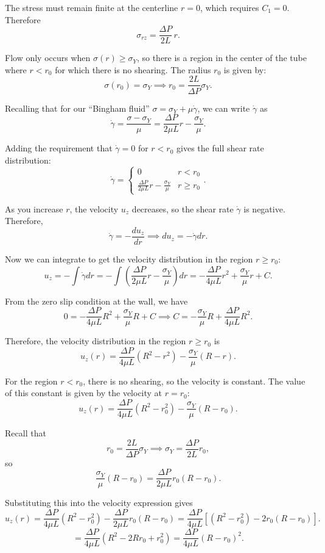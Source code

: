 The stress must remain finite at the centerline $r=0$, which requires $C_1 = 0$. Therefore
\[
	\boxed{\sigma_{rz} = \frac{\Delta P}{2L}\, r}.
\]

Flow only occurs when $\sigma(r) \geq \sigma_Y$, so there is a region in the center of the tube where $r < r_0$ for which there is no shearing.
The radius $r_0$ is given by:
\[
	\sigma(r_0) = \sigma_Y \implies r_0 = \frac{2L}{\Delta P}\sigma_Y.
\]

Recalling that for our ``Bingham fluid'' $\sigma = \sigma_Y + \mu \dot\gamma$, we can write $\dot\gamma$ as
\[
	\dot\gamma = \frac{\sigma - \sigma_Y}{\mu}
	= \frac{\Delta P}{2\mu L}r - \frac{\sigma_Y}{\mu}.
\]

Adding the requirement that $\dot\gamma = 0$ for $r < r_0$ gives the full shear rate distribution:
\[
	\boxed{\dot\gamma = \begin{cases}
		0 & r < r_0 \\
		\frac{\Delta P}{2\mu L}r - \frac{\sigma_Y}{\mu} & r \geq r_0
	\end{cases}}.
\]

As you increase $r$, the velocity $u_z$ decreases, so the shear rate $\dot\gamma$ is negative. Therefore,
\[
	\dot\gamma  = - \frac{du_z}{dr} \implies du_z = -\dot\gamma dr.
\]

Now we can integrate to get the velocity distribution in the region $r \geq r_0$:
\[
	u_z = -\int \dot\gamma dr
		= -\int \left(\frac{\Delta P}{2\mu L}r - \frac{\sigma_Y}{\mu}\right) dr
		= -\frac{\Delta P}{4\mu L}r^2 + \frac{\sigma_Y}{\mu}r + C.
\]

From the zero slip condition at the wall, we have
\[
	0 = -\frac{\Delta P}{4\mu L}R^2 + \frac{\sigma_Y}{\mu}R + C
	\implies C = - \frac{\sigma_Y}{\mu}R + \frac{\Delta P}{4\mu L}R^2.
\]

Therefore, the velocity distribution in the region $r \geq r_0$ is
\[
	u_z(r) = \frac{\Delta P}{4\mu L}(R^2 - r^2) - \frac{\sigma_Y}{\mu}(R - r).
\]

For the region $r < r_0$, there is no shearing, so the velocity is constant. The value of this constant is given by the velocity at $r = r_0$:
\[
	u_z(r) = \frac{\Delta P}{4\mu L}(R^2 - r_0^2) - \frac{\sigma_Y}{\mu}(R - r_0).
\]

Recall that
\[
	r_0 = \frac{2L}{\Delta P}\sigma_Y \implies \sigma_Y = \frac{\Delta P}{2L}r_0,
\]
so
\[
	\frac{\sigma_Y}{\mu}(R - r_0)
	=
	\frac{\Delta P}{2\mu L}r_0(R - r_0).
\]

Substituting this into the velocity expression gives
\[
	u_z(r)
	=
	\frac{\Delta P}{4\mu L}(R^2 - r_0^2)
	-
	\frac{\Delta P}{2\mu L}r_0(R - r_0)
	=
	\frac{\Delta P}{4\mu L}
	\left[
	(R^2 - r_0^2) - 2r_0(R - r_0)
	\right].
\]
\[
	=
	\frac{\Delta P}{4\mu L}
	(R^2 - 2Rr_0 + r_0^2)
	=
	\frac{\Delta P}{4\mu L}
	(R - r_0)^2.
\]


